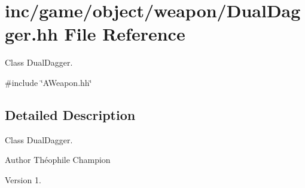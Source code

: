 \hypertarget{DualDagger_8hh}{}\section{inc/game/object/weapon/\+Dual\+Dagger.hh File Reference}
\label{DualDagger_8hh}


Class Dual\+Dagger.  


{\ttfamily \#include \char`\"{}A\+Weapon.\+hh\char`\"{}}\newline


\subsection{Detailed Description}
Class Dual\+Dagger. 

\begin{DoxyAuthor}{Author}
Théophile Champion 
\end{DoxyAuthor}
\begin{DoxyVersion}{Version}
1. 
\end{DoxyVersion}
